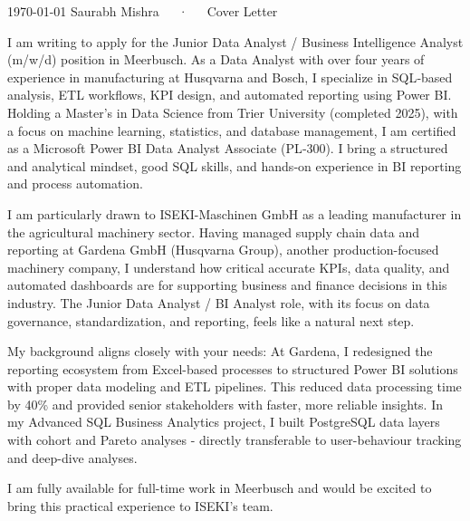 \documentclass[11pt, a4paper]{awesome-cv}
\begin{document}
\makecvheader[R]
\makecvfooter
  {\today}
  {Saurabh Mishra~~~·~~~Cover Letter}
  {}

\makelettertitle

\begin{cvletter}
I am writing to apply for the Junior Data Analyst / Business Intelligence Analyst (m/w/d) position in Meerbusch.
As a Data Analyst with over four years of experience in manufacturing at Husqvarna and Bosch, I specialize in SQL‑based analysis, ETL workflows, KPI design, and automated reporting using Power BI. Holding a Master’s in Data Science from Trier University (completed 2025), with a focus on machine learning, statistics, and database management, I am certified as a Microsoft Power BI Data Analyst Associate (PL‑300). I bring a structured and analytical mindset, good SQL skills, and hands‑on experience in BI reporting and process automation.

I am particularly drawn to ISEKI-Maschinen GmbH as a leading manufacturer in the agricultural machinery sector. Having managed supply chain data and reporting at Gardena GmbH (Husqvarna Group), another production-focused machinery company, I understand how critical accurate KPIs, data quality, and automated dashboards are for supporting business and finance decisions in this industry. The Junior Data Analyst / BI Analyst role, with its focus on data governance, standardization, and reporting, feels like a natural next step.

My background aligns closely with your needs: At Gardena, I redesigned the reporting ecosystem from Excel-based processes to structured Power BI solutions with proper data modeling and ETL pipelines. This reduced data processing time by 40\% and provided senior stakeholders with faster, more reliable insights. In my Advanced SQL Business Analytics project, I built PostgreSQL data layers with cohort and Pareto analyses - directly transferable to user-behaviour tracking and deep-dive analyses.

I am fully available for full-time work in Meerbusch and would be excited to bring this practical experience to ISEKI’s team.

\end{cvletter}
\makeletterclosing
\end{document}
